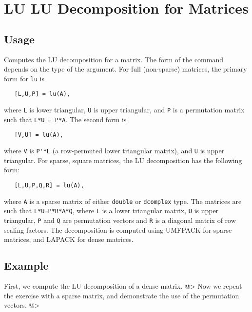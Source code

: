 \section{LU LU Decomposition for Matrices}

\subsection{Usage}

Computes the LU decomposition for a matrix.  The form of the
command depends on the type of the argument.  For full (non-sparse)
matrices, the primary form for \verb|lu| is
\begin{verbatim}
   [L,U,P] = lu(A),
\end{verbatim}
where \verb|L| is lower triangular, \verb|U| is upper triangular, and
\verb|P| is a permutation matrix such that \verb|L*U = P*A|.  The second form is
\begin{verbatim}
   [V,U] = lu(A),
\end{verbatim}
where \verb|V| is \verb|P'*L| (a row-permuted lower triangular matrix), 
and \verb|U| is upper triangular.  For sparse, square matrices,
the LU decomposition has the following form:
\begin{verbatim}
   [L,U,P,Q,R] = lu(A),
\end{verbatim}
where \verb|A| is a sparse matrix of either \verb|double| or \verb|dcomplex| type.
The matrices are such that \verb|L*U=P*R*A*Q|, where \verb|L| is a lower triangular
matrix, \verb|U| is upper triangular, \verb|P| and \verb|Q| are permutation vectors
and \verb|R| is a diagonal matrix of row scaling factors.  The decomposition
 is computed using UMFPACK for sparse matrices, and LAPACK for dense
 matrices.
\subsection{Example}

First, we compute the LU decomposition of a dense matrix.
@>
Now we repeat the exercise with a sparse matrix, and demonstrate
the use of the permutation vectors.
@>
